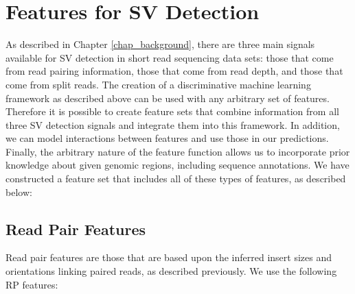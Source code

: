 \section{Features for SV Detection}

As described in Chapter \ref{chap_background}, there are three main signals available for SV detection in short read sequencing data sets: those that come from read pairing information, those that come from read depth, and those that come from split reads. The creation of a discriminative machine learning framework as described above can be used with any arbitrary set of features. Therefore it is possible to create feature sets that combine information from all three SV detection signals and integrate them into this framework. In addition, we can model interactions between features and use those in our predictions. Finally, the arbitrary nature of the feature function allows us to incorporate prior knowledge about given genomic regions, including sequence annotations. We have constructed a feature set that includes all of these types of features, as described below:

\subsection{Read Pair Features}

Read pair features are those that are based upon the inferred insert sizes and orientations linking paired reads, as described previously. We use the following RP features:

